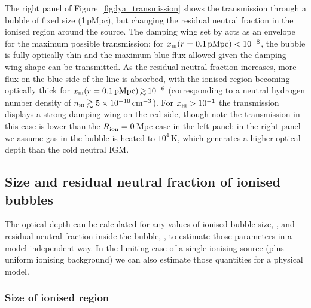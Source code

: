 \documentclass[fleqn,usenatbib]{mnras}
\begin{document}
The right panel of Figure~\ref{fig:lya_transmission} shows the transmission through a bubble of fixed size (1\,pMpc), but changing the residual neutral fraction in the ionised region around the source. The damping wing set by \Rion acts as an envelope for the maximum possible transmission: for $\xHI(r=0.1\,\mathrm{pMpc}) < 10^{-8}$, the bubble is fully optically thin and the maximum blue flux allowed given the damping wing shape can be transmitted. As the residual neutral fraction increases, more flux on the blue side of the line is absorbed, with the ionised region becoming optically thick for $\xHI(r=0.1\,\mathrm{pMpc}) \simgt 10^{-6}$ (corresponding to a neutral hydrogen number density of $n_\HI\gtrsim 5\times10^{-10}\cm^{-3}$). For $\xHI > 10^{-1}$ the transmission displays a strong damping wing on the red side, though note the transmission in this case is lower than the $\Rion=0$\,Mpc case in the left panel: in the right panel we assume gas in the bubble is heated to $10^4\,$K, which generates a higher optical depth than the cold neutral IGM.

\subsection{Size and residual neutral fraction of ionised bubbles}
\label{sec:model_HIIregion}

The optical depth can be calculated for any values of ionised bubble size, \Rion, and residual neutral fraction inside the bubble, \xHI, to estimate those parameters in a model-independent way. In the limiting case of a single ionising source (plus uniform ionising background) we can also estimate those quantities for a physical model.

\subsubsection{Size of ionised region}
\label{sec:model_HIIregion_R}
\end{document}
